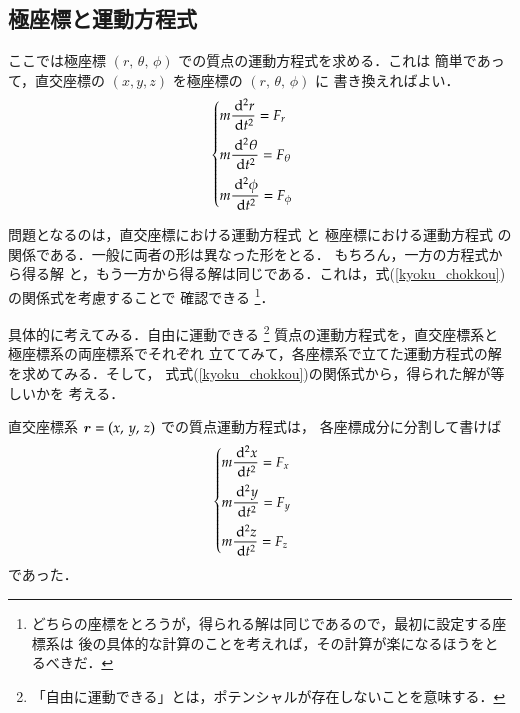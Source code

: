 \subsection{極座標と運動方程式}
                ここでは極座標 $\left(r,\,\theta,\,\phi\right)$ での質点の運動方程式を求める．これは
                簡単であって，直交座標の $\left(x, y, z\right)$ を極座標の $\left(r,\,\theta,\,\phi\right)$ に
                書き換えればよい．
                \begin{align}
                            \begin{cases}\label{un_hou_kyoku}
                                \displaystyle m\frac{\df^{2} r}{\df t^{2}}=F_{r} \vspace{2mm} \\
                                \displaystyle m\frac{\df^{2} \theta}{\df t^{2}}=F_{\theta} \vspace{2mm} \\
                                \displaystyle m\frac{\df^{2} \phi}{\df t^{2}}=F_{\phi}
                            \end{cases}
                \end{align}

                問題となるのは，直交座標における運動方程式 と 極座標における運動方程式 の
                関係である．一般に両者の形は異なった形をとる．
                もちろん，一方の方程式から得る解
                と，もう一方から得る解は同じである．これは，式(\ref{kyoku_chokkou})の関係式を考慮することで
                確認できる
                \footnote{
                どちらの座標をとろうが，得られる解は同じであるので，最初に設定する座標系は
                後の具体的な計算のことを考えれば，その計算が楽になるほうをとるべきだ．
                }．

                具体的に考えてみる．自由に運動できる
                \footnote{
                「自由に運動できる」とは，ポテンシャルが存在しないことを意味する．
                }
                質点の運動方程式を，直交座標系と極座標系の両座標系でそれぞれ
                立ててみて，各座標系で立てた運動方程式の解を求めてみる．そして，
                式式(\ref{kyoku_chokkou})の関係式から，得られた解が等しいかを
                考える．

                直交座標系 $\boldsymbol{r}=\left(x,\,y,\,z\right)$ での質点運動方程式は，
                各座標成分に分割して書けば
                \begin{align}
                            \begin{cases}\label{un_hou_chok}
                                \displaystyle m\frac{\df^{2} x}{\df t^{2}}=F_{x} \vspace{2mm} \\
                                \displaystyle m\frac{\df^{2} y}{\df t^{2}}=F_{y} \vspace{2mm} \\
                                \displaystyle m\frac{\df^{2} z}{\df t^{2}}=F_{z}
                            \end{cases}
                \end{align}
                であった．
